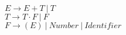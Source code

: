 \begin{center}
    $ E \rightarrow E + T \ | \ T$ \\
    $ T \rightarrow T \cdot F \ | \ F$ \\
    $ F \rightarrow (E) \ |\  Number \ | \ Identifier$
\end{center}
